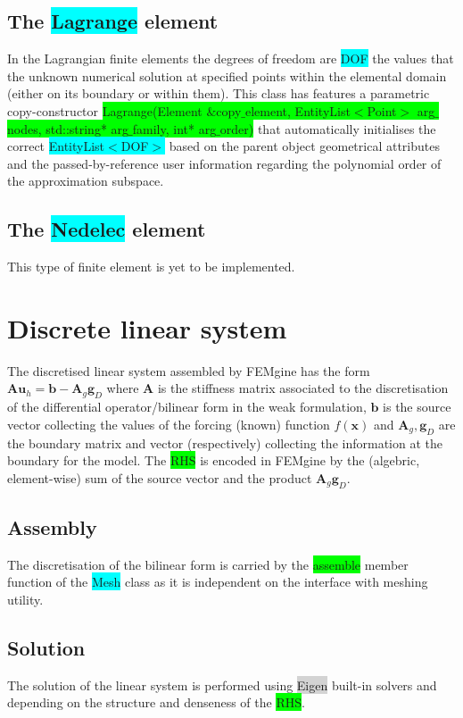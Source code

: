 \documentclass[11pt]{article}
\begin{document}
\subsection{The \colorbox{cyan}{Lagrange} element}
In the Lagrangian finite elements the degrees of freedom are \colorbox{cyan}{DOF} the values that the unknown numerical solution at specified points within the elemental domain (either on its boundary or within them). This class has features a parametric copy-constructor 
\newline
\noindent
\colorbox{lime}{Lagrange(Element $\&$copy$\_$element, EntityList$<$Point$>$ arg$\_$nodes, std::string* arg$\_$family, int* arg$\_$order)} that automatically initialises the correct \colorbox{cyan}{EntityList$<$DOF$>$} based on the parent object geometrical attributes and the passed-by-reference user information regarding the polynomial order of the approximation subspace.

\subsection{The \colorbox{cyan}{Nedelec} element}
This type of finite element is yet to be implemented.

\section{Discrete linear system}
\noindent
The discretised linear system assembled by FEMgine has the form $\mathbf{A}\mathbf{u}_h=\mathbf{b}-\mathbf{A}_g\mathbf{g}_D$ where $\mathbf{A}$ is the stiffness matrix associated to the discretisation of the differential operator/bilinear form in the weak formulation, $\mathbf{b}$ is the source vector collecting the values of the forcing (known) function $f(\mathbf{x})$ and $\mathbf{A}_g, \mathbf{g}_D$ are the boundary matrix and vector (respectively) collecting the information at the boundary for the model. The \colorbox{lime}{RHS} is encoded in FEMgine by the (algebric, element-wise) sum of the source vector and the product $\mathbf{A}_g\mathbf{g}_D$.

\subsection{Assembly}
The discretisation of the bilinear form is carried by the \colorbox{lime}{assemble} member function of the \colorbox{cyan}{Mesh} class as it is independent on the interface with meshing utility.

\subsection{Solution}
The solution of the linear system is performed using \colorbox{lightgray}{Eigen} built-in solvers and depending on the structure and denseness of the \colorbox{lime}{RHS}.
\end{document}
